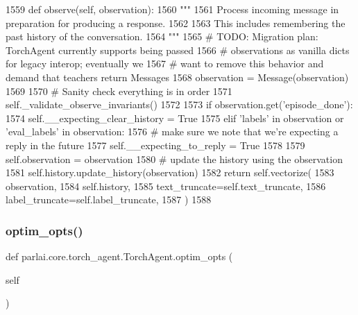 \begin{DoxyCode}
1559     \textcolor{keyword}{def }observe(self, observation):
1560         \textcolor{stringliteral}{"""}
1561 \textcolor{stringliteral}{        Process incoming message in preparation for producing a response.}
1562 \textcolor{stringliteral}{}
1563 \textcolor{stringliteral}{        This includes remembering the past history of the conversation.}
1564 \textcolor{stringliteral}{        """}
1565         \textcolor{comment}{# TODO: Migration plan: TorchAgent currently supports being passed}
1566         \textcolor{comment}{# observations as vanilla dicts for legacy interop; eventually we}
1567         \textcolor{comment}{# want to remove this behavior and demand that teachers return Messages}
1568         observation = Message(observation)
1569 
1570         \textcolor{comment}{# Sanity check everything is in order}
1571         self.\_validate\_observe\_invariants()
1572 
1573         \textcolor{keywordflow}{if} observation.get(\textcolor{stringliteral}{'episode\_done'}):
1574             self.\_\_expecting\_clear\_history = \textcolor{keyword}{True}
1575         \textcolor{keywordflow}{elif} \textcolor{stringliteral}{'labels'} \textcolor{keywordflow}{in} observation \textcolor{keywordflow}{or} \textcolor{stringliteral}{'eval\_labels'} \textcolor{keywordflow}{in} observation:
1576             \textcolor{comment}{# make sure we note that we're expecting a reply in the future}
1577             self.\_\_expecting\_to\_reply = \textcolor{keyword}{True}
1578 
1579         self.observation = observation
1580         \textcolor{comment}{# update the history using the observation}
1581         self.history.update\_history(observation)
1582         \textcolor{keywordflow}{return} self.vectorize(
1583             observation,
1584             self.history,
1585             text\_truncate=self.text\_truncate,
1586             label\_truncate=self.label\_truncate,
1587         )
1588 
\end{DoxyCode}
\mbox{\label{classparlai_1_1core_1_1torch__agent_1_1TorchAgent_a9c622b8ed5a811841f30fe98cc297cde}} 
\subsubsection{\texorpdfstring{optim\+\_\+opts()}{optim\_opts()}}
{\footnotesize\ttfamily def parlai.\+core.\+torch\+\_\+agent.\+Torch\+Agent.\+optim\+\_\+opts (\begin{DoxyParamCaption}\item[{}]{self }\end{DoxyParamCaption})}

